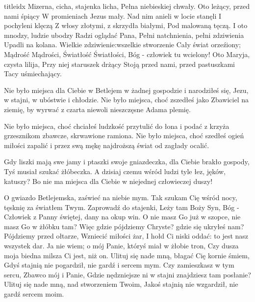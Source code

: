 \documentclass[a5paper, portrait, 12pt]{mwart}
\begin{document}
\begin{songs}{titleidx}
\beginverse
Mizerna, cicha, stajenka licha,
Pełna niebieskiej chwały.
Oto leżący, przed nami śpiący
W promieniach Jezus mały.
\endverse
\beginverse
Nad nim anieli w locie stanęli
I pochyleni klęczą
Z włosy złotymi, z skrzydła białymi,
Pod malowaną tęczą.
\endverse
\beginverse
I oto mnodzy, ludzie ubodzy
Radzi oglądać Pana,
Pełni natchnienia, pełni zdziwienia
Upadli na kolana.
\endverse
\beginverse
Wielkie zdziwienie:wszelkie stworzenie
Cały świat orzeźiony;
Mądrość Mądrości, Światłość Światłości,
Bóg - człowiek tu wcielony!
\endverse
\beginverse
Oto Maryja, czysta lilija,
Przy niej staruszek drżący
Stoją przed nami, przed pastuszkami
Tacy uśmiechający.
\endverse
\endsong


\beginverse
Nie było miejsca dla Ciebie
w Betlejem w żadnej gospodzie
i narodziłeś się, Jezu,
w stajni, w ubóstwie i chłodzie.
\endverse
\beginchorus
Nie było miejsca, choć zszedłeś
jako Zbawiciel na ziemię,
by wyrwać z czarta niewoli
nieszczęsne Adama plemię.
\endchorus

\beginverse
Nie było miejsca, choć chciałeś
ludzkość przytulić do łona
i podać z krzyża grzesznikom
zbawcze, skrwawione ramiona.
\endverse
\beginchorus
Nie było miejsca, choć szedłeś
ogień miłości zapalić
i przez swą mękę najdroższą
świat od zagłady ocalić.
\endchorus

\beginverse
Gdy liszki mają swe jamy
i ptaszki swoje gniazdeczka,
dla Ciebie brakło gospody,
Tyś musiał szukać żłóbeczka.
\endverse
\beginchorus
A dzisiaj czemu wśród ludzi
tyle łez, jęków, katuszy?
Bo nie ma miejsca dla Ciebie
w niejednej człowieczej duszy!
\endchorus
\endsong


\beginverse
O gwiazdo Betlejemska,
zaświeć na niebie mym.
Tak szukam Cię wśród nocy,
tęsknię za światłem Twym.
Zaprowadź do stajenki,
Leży tam Boży Syn,
Bóg - Człowiek z Panny świętej,
dany na okup win.
\endverse
\beginverse
O nie masz Go już w szopce,
nie masz Go w żłóbku tam?
Więc gdzie pójdziemy Chryste?
gdzie się ukryłeś nam?
Pójdziemy przed ołtarze,
Wzniecić miłości żar,
I hołd Ci niski oddać:
to jest nasz wszystek dar.
\endverse
\beginverse
Ja nie wiem; o mój Panie,
któryś miał w żłobie tron,
Czy dusza moja biedna
milsza Ci jest, niż on.
Ulituj się nade mną, błagać Cię
kornie śmiem,
Gdyś stajnią nie pogardził,
nie gardź i sercem mym.
\endverse
\beginverse
Czy zamieszkasz w tym sercu,
Zbawco mój i Panie,
Gdzie nędzniejsze ni w stajni
znajdziesz tam posłanie?
Ulituj się nade mną,
nad stworzeniem Twoim,
Jakoś stajnią nie wzgardził,
nie gardź sercem moim.
\endverse
\endsong



\end{songs}
\end{document}
